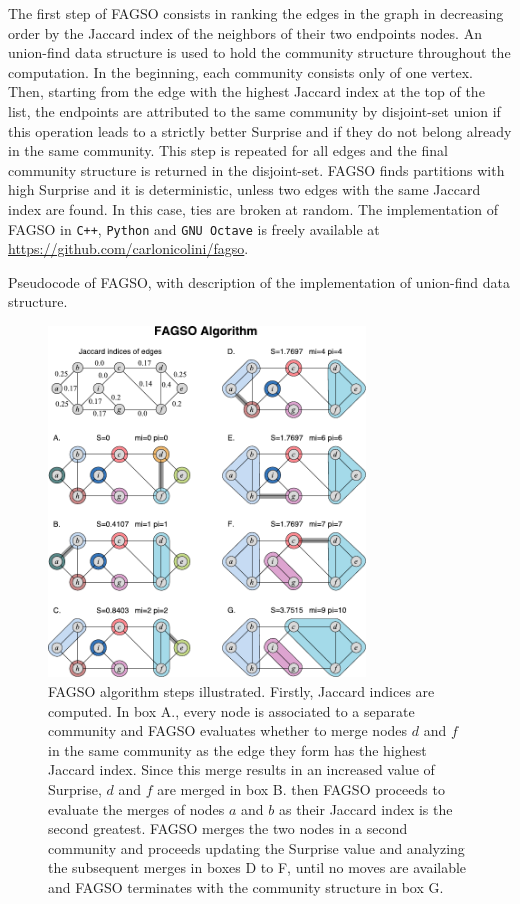 The first step of FAGSO consists in ranking the edges in the graph in decreasing order by the Jaccard index of the neighbors of their two endpoints nodes.
An union-find data structure is used to hold the community structure throughout the computation.
In the beginning, each community consists only of one vertex.
Then, starting from the edge with the highest Jaccard index at the top of the list, the endpoints are attributed to the same community by disjoint-set union if this operation leads to a strictly better Surprise and if they do not belong already in the same community.
This step is repeated for all edges and the final community structure is returned in the disjoint-set.
FAGSO finds partitions with high Surprise and it is deterministic, unless two edges with the same Jaccard index are found. In this case, ties are broken at random. 
The implementation of FAGSO in \texttt{C++}, \texttt{Python} and \texttt{GNU Octave} is freely available at \url{https://github.com/carlonicolini/fagso}.
\begin{Algorithm}[htb!]

\caption{Pseudocode of FAGSO, with description of the implementation of union-find data structure.}
\label{alg:fagso}
\end{Algorithm}
\begin{figure}[htb!]
\centering
\includegraphics[width=0.75\textwidth]{images/fagso.pdf}
\caption{FAGSO algorithm steps illustrated. Firstly, Jaccard indices are computed. In box A., every node is associated to a separate community and FAGSO evaluates whether to merge nodes $d$ and $f$ in the same community as the edge they form has the highest Jaccard index. Since this merge results in an increased value of Surprise, $d$ and $f$ are merged in box B. then FAGSO proceeds to evaluate the merges of nodes $a$ and $b$ as their Jaccard index is the second greatest. FAGSO merges the two nodes in a second community and proceeds updating the Surprise value and analyzing the subsequent merges in boxes D to F, until no moves are available and FAGSO terminates with the community structure in box G.}
\label{fig:fagso_working}
\end{figure}

